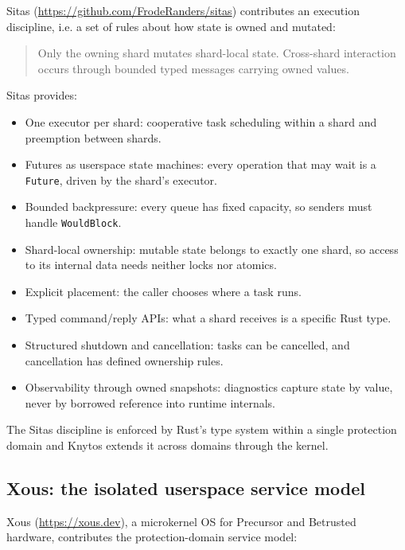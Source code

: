 Sitas (\url{https://github.com/FrodeRanders/sitas}) contributes an execution
discipline, i.e. a set of rules about how state is owned and mutated:

\begin{quote}
Only the owning shard mutates shard-local state. Cross-shard interaction occurs
through bounded typed messages carrying owned values.
\end{quote}

Sitas provides:

\begin{itemize}
    \item One executor per shard: cooperative task scheduling within
        a shard and preemption between shards.
    \item Futures as userspace state machines: every operation that may
        wait is a \texttt{Future}, driven by the shard's executor.
    \item Bounded backpressure: every queue has fixed capacity, so senders
        must handle \texttt{WouldBlock}.
    \item Shard-local ownership: mutable state belongs to exactly one
        shard, so access to its internal data needs neither locks nor atomics.
    \item Explicit placement: the caller chooses where a task runs.
    \item Typed command/reply APIs: what a shard receives is a specific
        Rust type.
    \item Structured shutdown and cancellation: tasks can be cancelled,
        and cancellation has defined ownership rules.
    \item Observability through owned snapshots: diagnostics capture
        state by value, never by borrowed reference into runtime internals.
\end{itemize}

The Sitas discipline is enforced by Rust's type system within a single protection
domain and Knytos extends it across domains through the kernel.

\subsection{Xous: the isolated userspace service model}

Xous (\url{https://xous.dev}), a microkernel OS for Precursor and Betrusted hardware,
contributes the protection-domain service model:

